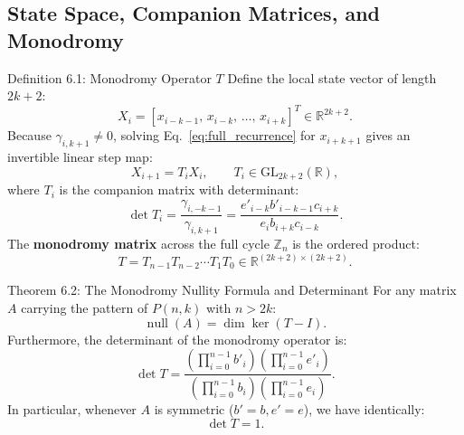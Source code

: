 \documentclass[11pt]{article}
\begin{document}
\subsection{State Space, Companion Matrices, and Monodromy}

\begin{defbox}{Definition 6.1: Monodromy Operator $T$}
Define the local state vector of length $2k+2$:
\begin{equation}
  X_i = [x_{i-k-1}, \, x_{i-k}, \, \dots, \, x_{i+k}]^T \in \mathbb{R}^{2k+2}.
\end{equation}
Because $\gamma_{i, k+1} \ne 0$, solving Eq.~\eqref{eq:full_recurrence} for $x_{i+k+1}$ gives an invertible linear step map:
\begin{equation}
  X_{i+1} = T_i X_i, \qquad T_i \in \mathrm{GL}_{2k+2}(\mathbb{R}),
\end{equation}
where $T_i$ is the companion matrix with determinant:
\begin{equation}
  \det T_i = \frac{\gamma_{i, -k-1}}{\gamma_{i, k+1}} = \frac{e'_{i-k} b'_{i-k-1} c_{i+k}}{e_i b_{i+k} c_{i-k}}.
\end{equation}
The \textbf{monodromy matrix} across the full cycle $\mathbb{Z}_n$ is the ordered product:
\begin{equation}
  T = T_{n-1} T_{n-2} \cdots T_1 T_0 \in \mathbb{R}^{(2k+2) \times (2k+2)}.
\end{equation}
\end{defbox}

\begin{thmbox}{Theorem 6.2: The Monodromy Nullity Formula and Determinant}
For any matrix $A$ carrying the pattern of $P(n,k)$ with $n > 2k$:
\begin{equation}
  \operatorname{null}(A) = \dim\ker(T - I).
\end{equation}
Furthermore, the determinant of the monodromy operator is:
\begin{equation}
  \det T = \frac{\left(\prod_{i=0}^{n-1} b'_i\right) \left(\prod_{i=0}^{n-1} e'_i\right)}{\left(\prod_{i=0}^{n-1} b_i\right) \left(\prod_{i=0}^{n-1} e_i\right)}.
\end{equation}
In particular, whenever $A$ is symmetric ($b'=b, e'=e$), we have identically:
\begin{equation}
  \det T = 1.
\end{equation}
\end{thmbox}
\end{document}
